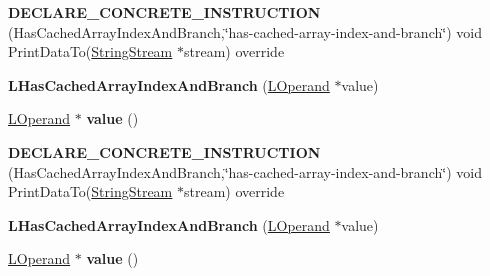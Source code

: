 \begin{DoxyCompactItemize}
\item 
{\bfseries D\+E\+C\+L\+A\+R\+E\+\_\+\+C\+O\+N\+C\+R\+E\+T\+E\+\_\+\+I\+N\+S\+T\+R\+U\+C\+T\+I\+ON} (Has\+Cached\+Array\+Index\+And\+Branch,\char`\"{}has-\/cached-\/array-\/index-\/and-\/branch\char`\"{}) void Print\+Data\+To(\hyperlink{classv8_1_1internal_1_1_string_stream}{String\+Stream} $\ast$stream) override\hypertarget{classv8_1_1internal_1_1_l_has_cached_array_index_and_branch_ada0480ef52e3ce280f071aa7c11faa18}{}\label{classv8_1_1internal_1_1_l_has_cached_array_index_and_branch_ada0480ef52e3ce280f071aa7c11faa18}

\item 
{\bfseries L\+Has\+Cached\+Array\+Index\+And\+Branch} (\hyperlink{classv8_1_1internal_1_1_l_operand}{L\+Operand} $\ast$value)\hypertarget{classv8_1_1internal_1_1_l_has_cached_array_index_and_branch_a466ac157abb71acfb478af7ce2d78d3e}{}\label{classv8_1_1internal_1_1_l_has_cached_array_index_and_branch_a466ac157abb71acfb478af7ce2d78d3e}

\item 
\hyperlink{classv8_1_1internal_1_1_l_operand}{L\+Operand} $\ast$ {\bfseries value} ()\hypertarget{classv8_1_1internal_1_1_l_has_cached_array_index_and_branch_ac41a448a9c06b6b037880bdea9490ae4}{}\label{classv8_1_1internal_1_1_l_has_cached_array_index_and_branch_ac41a448a9c06b6b037880bdea9490ae4}

\item 
{\bfseries D\+E\+C\+L\+A\+R\+E\+\_\+\+C\+O\+N\+C\+R\+E\+T\+E\+\_\+\+I\+N\+S\+T\+R\+U\+C\+T\+I\+ON} (Has\+Cached\+Array\+Index\+And\+Branch,\char`\"{}has-\/cached-\/array-\/index-\/and-\/branch\char`\"{}) void Print\+Data\+To(\hyperlink{classv8_1_1internal_1_1_string_stream}{String\+Stream} $\ast$stream) override\hypertarget{classv8_1_1internal_1_1_l_has_cached_array_index_and_branch_ada0480ef52e3ce280f071aa7c11faa18}{}\label{classv8_1_1internal_1_1_l_has_cached_array_index_and_branch_ada0480ef52e3ce280f071aa7c11faa18}

\item 
{\bfseries L\+Has\+Cached\+Array\+Index\+And\+Branch} (\hyperlink{classv8_1_1internal_1_1_l_operand}{L\+Operand} $\ast$value)\hypertarget{classv8_1_1internal_1_1_l_has_cached_array_index_and_branch_a466ac157abb71acfb478af7ce2d78d3e}{}\label{classv8_1_1internal_1_1_l_has_cached_array_index_and_branch_a466ac157abb71acfb478af7ce2d78d3e}

\item 
\hyperlink{classv8_1_1internal_1_1_l_operand}{L\+Operand} $\ast$ {\bfseries value} ()\hypertarget{classv8_1_1internal_1_1_l_has_cached_array_index_and_branch_ac41a448a9c06b6b037880bdea9490ae4}{}\label{classv8_1_1internal_1_1_l_has_cached_array_index_and_branch_ac41a448a9c06b6b037880bdea9490ae4}


\end{DoxyCompactItemize}
